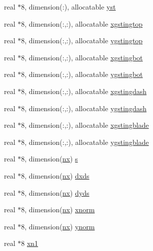 \begin{DoxyCompactItemize}
real $\ast$8, dimension(\+:), allocatable \hyperlink{namespacegridvar_addb37740c3b5b897fb0e5a34bfbcf08c}{yst}
\item 
real $\ast$8, dimension(\+:,\+:), allocatable \hyperlink{namespacegridvar_a13592c5c62fa4125e18fa8df3f64a43b}{xgstingtop}
\item 
real $\ast$8, dimension(\+:,\+:), allocatable \hyperlink{namespacegridvar_a7ca6b72f5d1eb6a91685b56d93b936c6}{ygstingtop}
\item 
real $\ast$8, dimension(\+:,\+:), allocatable \hyperlink{namespacegridvar_a280b9f2c74950beb202cb0aae123fb8a}{xgstingbot}
\item 
real $\ast$8, dimension(\+:,\+:), allocatable \hyperlink{namespacegridvar_a819dd42b0469aff2373b237be7d72b84}{ygstingbot}
\item 
real $\ast$8, dimension(\+:,\+:), allocatable \hyperlink{namespacegridvar_a995496c4b06b80179c34232029a8c471}{xgstingdash}
\item 
real $\ast$8, dimension(\+:,\+:), allocatable \hyperlink{namespacegridvar_a000b3ae1934c0e65a9b3c6d914ba6339}{ygstingdash}
\item 
real $\ast$8, dimension(\+:,\+:), allocatable \hyperlink{namespacegridvar_adc4e81d08a89fa23d69d38d5128e0e97}{xgstingblade}
\item 
real $\ast$8, dimension(\+:,\+:), allocatable \hyperlink{namespacegridvar_a11c63db6c8ecfb576129fdd9eedeb158}{ygstingblade}
\item 
real $\ast$8, dimension(\hyperlink{namespacegridvar_ac50c143a371abc586b838320ddc88fdc}{nx}) \hyperlink{namespacegridvar_a8501e472d9155bb35061c43281ef6ba5}{s}
\item 
real $\ast$8, dimension(\hyperlink{namespacegridvar_ac50c143a371abc586b838320ddc88fdc}{nx}) \hyperlink{namespacegridvar_a4e7a599ab9b156f0b92fcae94441b1df}{dxds}
\item 
real $\ast$8, dimension(\hyperlink{namespacegridvar_ac50c143a371abc586b838320ddc88fdc}{nx}) \hyperlink{namespacegridvar_ab83e7e8b7f1369a60b1ae1877ebd02b2}{dyds}
\item 
real $\ast$8, dimension(\hyperlink{namespacegridvar_ac50c143a371abc586b838320ddc88fdc}{nx}) \hyperlink{namespacegridvar_a0982bf7134515b2e97db0842a978bdcb}{xnorm}
\item 
real $\ast$8, dimension(\hyperlink{namespacegridvar_ac50c143a371abc586b838320ddc88fdc}{nx}) \hyperlink{namespacegridvar_ac91a158f48b7fda45b049e434e3c1147}{ynorm}
\item 
real $\ast$8 \hyperlink{namespacegridvar_a314572d3cf48c6611fe18f0c35f14aa2}{xn1}

\end{DoxyCompactItemize}
